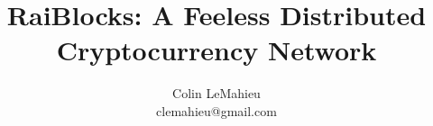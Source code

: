 \documentclass[journal]{IEEEtran}
\begin{document}
\title{RaiBlocks: A Feeless Distributed Cryptocurrency Network}

\author{Colin LeMahieu\\clemahieu@gmail.com}%


% 
%


\maketitle


\end{document}
